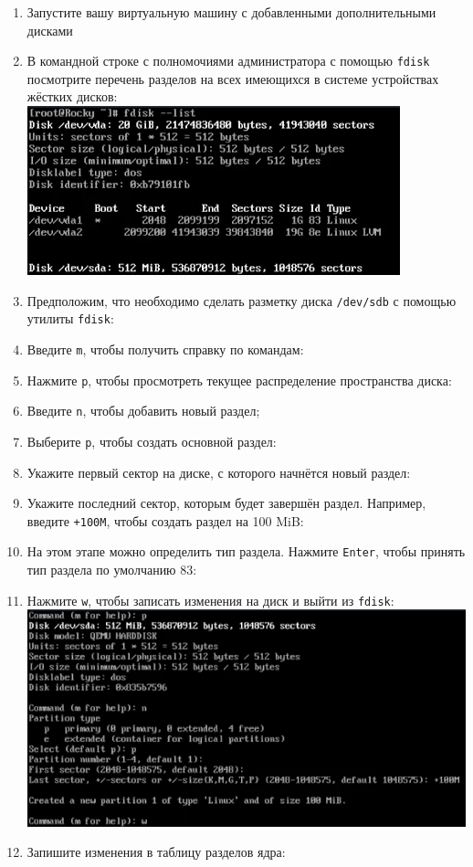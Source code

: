\documentclass[12pt]{article}
\begin{document}
\begin{enumerate}
	\item Запустите вашу виртуальную машину с добавленными дополнительными дисками
	\item В командной строке с полномочиями администратора с помощью \texttt{fdisk} посмотрите перечень разделов на всех имеющихся в системе устройствах жёстких дисков:
	      \\\includegraphics{1.png}
	\item Предположим, что необходимо сделать разметку диска \texttt{/dev/sdb} с помощью утилиты \texttt{fdisk}:
	\item Введите \texttt{m}, чтобы получить справку по командам:
	\item Нажмите \texttt{p}, чтобы просмотреть текущее распределение пространства диска:
	\item Введите \texttt{n}, чтобы добавить новый раздел;
	\item Выберите \texttt{p}, чтобы создать основной раздел:
	\item Укажите первый сектор на диске, с которого начнётся новый раздел:
	\item Укажите последний сектор, которым будет завершён раздел. Например, введите \texttt{+100M}, чтобы создать раздел на 100 MiB:
	\item На этом этапе можно определить тип раздела. Нажмите \texttt{Enter}, чтобы принять тип раздела по умолчанию 83:
	\item Нажмите \texttt{w}, чтобы записать изменения на диск и выйти из \texttt{fdisk}:
	      \\\includegraphics{2.png}
	\item Запишите изменения в таблицу разделов ядра:
\end{enumerate}
\end{document}
